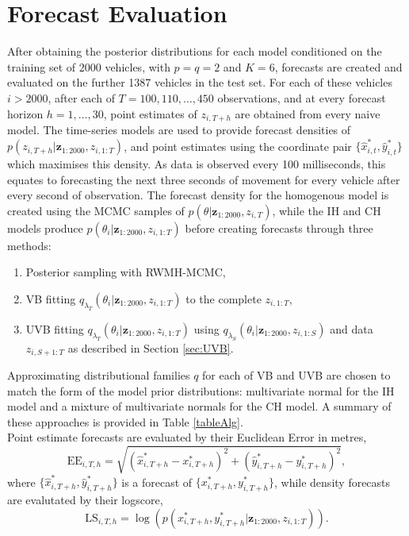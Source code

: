 \documentclass[12pt,a4paper]{article}\usepackage[]{graphicx}\usepackage[]{color}
\begin{document}
{\section{Forecast Evaluation}
\label{sec:eval}

After obtaining the posterior distributions for each model conditioned on the training set of 2000 vehicles, with $p = q = 2$ and $K = 6$, forecasts are created and evaluated on the  further 1387 vehicles in the test set. For each of these vehicles $i > 2000$, after each of $T = 100, 110, \dots, 450$ observations, and at every forecast horizon $h = 1, \dots, 30$, point estimates of $z_{i, T+h}$ are obtained from every naive model. The time-series models are used to provide forecast densities of $p(z_{i, T+h} | \textbf{z}_{1:2000}, z_{i, 1:T})$, and point estimates using the coordinate pair $\{\hat{x}_{i, t}^*, \hat{y}_{i, t}^*\}$ which maximises this density. As data is observed every 100 milliseconds, this equates to forecasting the next three seconds of movement for every vehicle after every second of observation. The forecast density for the homogenous model is created using the MCMC samples of $p(\theta | \textbf{z}_{1:2000}, z_{i, T})$, while the IH and CH models produce $p(\theta_{i} | \textbf{z}_{1:2000}, z_{i, 1:T})$ before creating forecasts through three methods:
\begin{enumerate}
\item Posterior sampling with RWMH-MCMC,
\item VB fitting $q_{\lambda_T}(\theta_{i} | \textbf{z}_{1:2000}, z_{i, 1:T})$ to the complete $z_{i, 1:T}$,
\item UVB fitting $q_{\lambda_T}(\theta_{i} | \textbf{z}_{1:2000}, z_{i, 1:T})$ using $q_{\lambda_S}(\theta_{i} | \textbf{z}_{1:2000}, z_{i, 1:S})$ and data $z_{i, S+1:T}$ as described in Section \ref{sec:UVB}.
\end{enumerate}

Approximating distributional families $q$ for each of VB and UVB are chosen to match the form of the model prior distributions: multivariate normal for the IH model and a mixture of multivariate normals for the CH model. A summary of these approaches is provided in Table \ref{tableAlg}. 
\\

Point estimate forecasts are evaluated by their Euclidean Error in metres,
\begin{equation}
\mbox{EE}_{i, T, h} = \sqrt{\left(\hat{x}^*_{i, T+h} - x^*_{i, T+h} \right)^2 + \left(\hat{y}^*_{i, T+h} - y^*_{i, T+h} \right)^2},
\label{eucError}
\end{equation}
where $\{\hat{x}^*_{i, T+h}, \hat{y}^*_{i, T+h}\}$ is a forecast of $\{x^*_{i, T+h}, y^*_{i, T+h}\}$, while density forecasts are evalutated by their logscore,
\begin{equation}
\mbox{LS}_{i, T, h} = \log \left(p\left(x^*_{i, T+h}, y^*_{i, T+h} | \textbf{z}_{1:2000}, z_{i, 1:T} \right) \right).
\label{logscore}
\end{equation}

}
\end{document}
